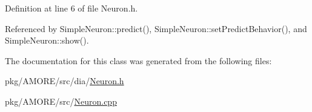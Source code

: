 Definition at line 6 of file Neuron.h.



Referenced by SimpleNeuron::predict(), SimpleNeuron::setPredictBehavior(), and SimpleNeuron::show().



The documentation for this class was generated from the following files:\begin{DoxyCompactItemize}
\item 
pkg/AMORE/src/dia/\hyperlink{_neuron_8h}{Neuron.h}\item 
pkg/AMORE/src/\hyperlink{_neuron_8cpp}{Neuron.cpp}\end{DoxyCompactItemize}
